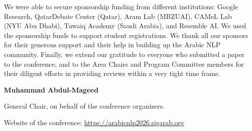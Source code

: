 We were able to secure sponsorship funding from different institutions: Google Research, QatarDebate Center (Qatar), Aram Lab (MBZUAI), CAMeL Lab (NYU Abu Dhabi), Tuwaiq Academy (Saudi Arabia), and Resemble AI. We used the sponsorship funds to support student registrations. We thank all our sponsors for their generous support and their help in building up the Arabic NLP community. Finally, we extend our gratitude to everyone who submitted a paper to the conference, and to the Area Chairs and Program Committee members for their diligent efforts in providing reviews within a very tight time frame.

\textbf{Muhammad Abdul-Mageed}

General Chair, on behalf of the conference organizers.

Website of the conference: \href{https://arabicnlp2026.sigarab.org}{https://arabicnlp2026.sigarab.org}
